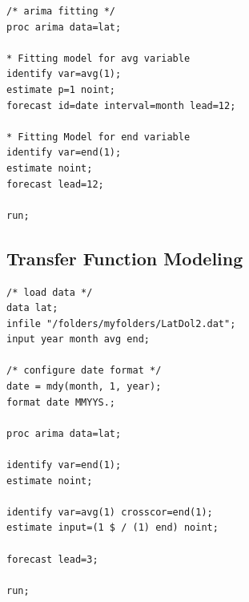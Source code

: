 \documentclass{article}
\begin{document}
\begin{appendices}
\begin{verbatim}
/* arima fitting */
proc arima data=lat;

* Fitting model for avg variable
identify var=avg(1);
estimate p=1 noint;
forecast id=date interval=month lead=12;

* Fitting Model for end variable
identify var=end(1);
estimate noint;
forecast lead=12;

run;
\end{verbatim}

\subsection{Transfer Function Modeling}\label{apdx:lat_tfm}

\begin{verbatim}
/* load data */
data lat;
infile "/folders/myfolders/LatDol2.dat";
input year month avg end;

/* configure date format */
date = mdy(month, 1, year);
format date MMYYS.;

proc arima data=lat;

identify var=end(1);
estimate noint;

identify var=avg(1) crosscor=end(1);
estimate input=(1 $ / (1) end) noint;

forecast lead=3;

run;
\end{verbatim}


\end{appendices}
\end{document}
